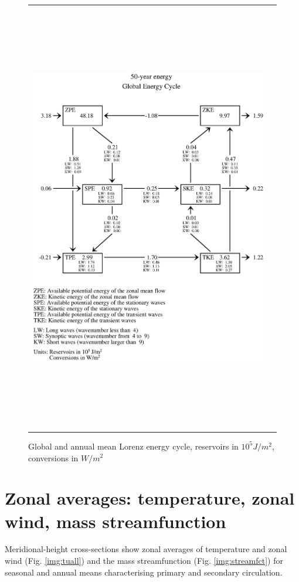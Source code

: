 \documentclass[12pt,a4paper,twoside,openright,headinclude,liststotoc,bibtotoc]{scrreprt}
\begin{document}
\begin{figure}[b]
\begin{tabular}{cc}
\begin{minipage}{1.0\textwidth}
\begin{center}
\includegraphics[height=19.0cm]{eps/LEZANM.eps}
\end{center}
\end{minipage}
\end{tabular}
\vspace{-5.2cm}\caption[Global and annual mean Lorenz energy cycle]{Global and annual mean Lorenz energy cycle, reservoirs in $10^{5}J/m^{2}$, conversions in $W/m^{2}$}
\label{img:lez}
\end{figure}

\vspace{-0.4cm}
\chapter{Zonal averages: temperature, zonal wind, mass streamfunction}
\vspace{-0.4cm}
Meridional-height cross-sections show zonal averages of temperature and zonal wind (Fig. \ref{img:tuall}) and the mass streamfunction (Fig. \ref{img:streamfct}) for seasonal and annual means characterising primary and secondary circulation.
\end{document}
